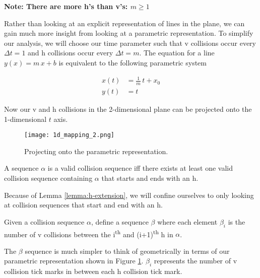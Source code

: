 
\textbf{Note: There are more h's than v's: $m \ge 1$}

Rather than looking at an explicit representation of lines in the plane, we can gain much more insight from looking at a parametric representation. To simplify our analysis, we will choose our time parameter such that v collisions occur every $\Delta t = 1$ and h collisions occur every $\Delta t = m$. The equation for a line $y(x) = m \, x + b$ is equivalent to the following parametric system

\begin{align}\label{eq:parametric-line}
	x(t)& = \frac{1}{m} \, t + x_0\\
	y(t)& = t
\end{align}

Now our v and h collisions in the 2-dimensional plane can be projected onto the 1-dimensional $t$ axis.

\begin{figure}[H]
  \begin{center}
    \texttt{[image: 1d\_mapping\_2.png]}
  \end{center}
  \vspace{-.2in} %
  \caption{\label{fig:1d-projection} Projecting onto the parametric representation.}
\end{figure}

\begin{lemma}\label{lemma:h-extension}
	A sequence $\alpha$ is a valid collision sequence iff there exists at least one valid collision sequence containing $\alpha$ that starts and ends with an h.
\end{lemma}

Because of Lemma \ref{lemma:h-extension}, we will confine ourselves to only looking at collision sequences that start and end with an h.

\begin{definition}
	Given a collision sequence $\alpha$, define a sequence $\beta$ where each element $\beta_i$ is the number of v collisions between the i\textsuperscript{th} and (i+1)\textsuperscript{th} h in $\alpha$.
\end{definition}

The $\beta$ sequence is much simpler to think of geometrically in terms of our parametric representation shown in Figure \ref{fig:1d-projection}. $\beta_i$ represents the number of v collision tick marks in between each h collision tick mark.

